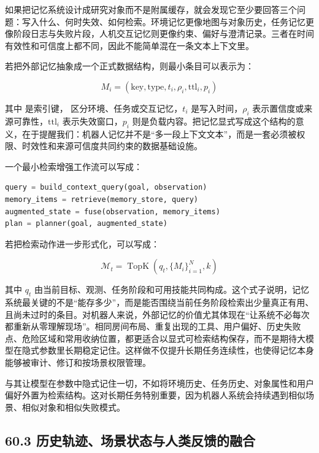 如果把记忆系统设计成研究对象而不是附属缓存，就会发现它至少要回答三个问题：写入什么、何时失效、如何检索。环境记忆更像地图与对象历史，任务记忆更像阶段日志与失败片段，人机交互记忆则更像约束、偏好与澄清记录。三者在时间有效性和可信度上都不同，因此不能简单混在一条文本上下文里。

若把外部记忆抽象成一个正式数据结构，则最小条目可以表示为：

\begingroup
\footnotesize
\begin{equation*}
M_i = (\text{key}, \text{type}, t_i, \rho_i, \mathrm{ttl}_i, p_i)
\end{equation*}
\endgroup

其中 \texttt{} 是索引键，\texttt{} 区分环境、任务或交互记忆，\(t_i\) 是写入时间，\(\rho_i\) 表示置信度或来源可靠性，\(\mathrm{ttl}_i\) 表示失效窗口，\(p_i\) 则是负载内容。把记忆显式写成这个结构的意义，在于提醒我们：机器人记忆并不是“多一段上下文文本”，而是一套必须被权限、时效性和来源可信度共同约束的数据基础设施。

一个最小检索增强工作流可以写成：

\begin{lstlisting}[language=python]
query = build_context_query(goal, observation)
memory_items = retrieve(memory_store, query)
augmented_state = fuse(observation, memory_items)
plan = planner(goal, augmented_state)
\end{lstlisting}

若把检索动作进一步形式化，可以写成：

\begingroup
\footnotesize
\begin{equation*}
\mathcal{M}_t = \operatorname{TopK}\!\left(q_t,\{M_i\}_{i=1}^{N}, k\right)
\end{equation*}
\endgroup

其中 \(q_t\) 由当前目标、观测、任务阶段和可用技能共同构成。这个式子说明，记忆系统最关键的不是“能存多少”，而是能否围绕当前任务阶段检索出少量真正有用、且尚未过时的条目。对机器人来说，外部记忆的价值尤其体现在“让系统不必每次都重新从零理解现场”。相同房间布局、重复出现的工具、用户偏好、历史失败点、危险区域和常用收纳位置，都更适合以显式可检索结构保存，而不是期待大模型在隐式参数里长期稳定记住。这样做不仅提升长期任务连续性，也使得记忆本身能够被审计、修订和按场景权限管理。

与其让模型在参数中隐式记住一切，不如将环境历史、任务历史、对象属性和用户偏好外置为检索结构。这对长期任务特别重要，因为机器人系统会持续遇到相似场景、相似对象和相似失败模式。

\subsection*{60.3 历史轨迹、场景状态与人类反馈的融合}


